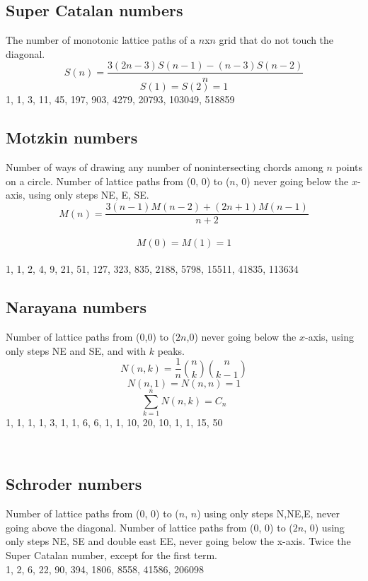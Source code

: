     \subsection{Super Catalan numbers}
    The number of monotonic lattice paths of a $n$x$n$ grid that do not touch the diagonal.\\
    $$S(n) = \frac{3(2n-3)S(n-1)-(n-3)S(n-2)}{n}$$
    $$S(1) = S(2) = 1$$
    1, 1, 3, 11, 45, 197, 903, 4279, 20793, 103049, 518859\\

    \subsection{Motzkin numbers}
    Number of ways of drawing any number of nonintersecting chords among $n$ points on a circle. Number of lattice paths from (0, 0) to ($n$, 0) never going below the $x$-axis, using only steps NE, E, SE.\\
   
    $$M(n) = \frac{3(n-1)M(n-2)+(2n+1)M(n-1)}{n+2}$$\\
    $$M(0) = M(1) = 1$$\\
    1, 1, 2, 4, 9, 21, 51, 127, 323, 835, 2188, 5798, 15511, 41835, 113634\newline

    \subsection{Narayana numbers}
    Number of lattice paths from (0,0) to ($2n$,0) never going below the $x$-axis, using only steps NE and SE, and with $k$ peaks.\\
    $$N(n,k) = \frac{1}{n} \binom{n}{k} \binom{n}{k-1}$$
    $$N(n,1) = N(n,n) = 1$$
    $$\sum_{k=1}^{n} N(n,k) = C_{n}$$
    1, 1, 1, 1, 3, 1, 1, 6, 6, 1, 1, 10, 20, 10, 1, 1, 15, 50


\


    \subsection{Schroder numbers}
	Number of lattice paths from (0, 0) to ($n$, $n$) using only steps
	N,NE,E, never going above the diagonal. Number of lattice
	paths from (0, 0) to ($2n$, 0) using only steps NE, SE and
	double east EE, never going below the x-axis. Twice the
	Super Catalan number, except for the first term.\\
	1, 2, 6, 22, 90, 394, 1806, 8558, 41586, 206098\\



